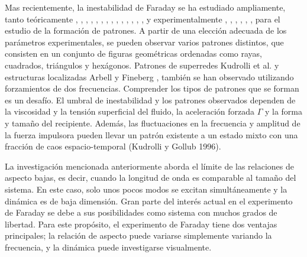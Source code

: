Mas recientemente, la inestabilidad de Faraday se ha estudiado ampliamente, tanto teóricamente \cite{Benjamin1954}, \cite{Miles1984}, \cite{Holmes1984}, \cite{Meron1986}, \cite{Gu1987}, \cite{Armbruster1989} \cite{Feng1989} \cite{Umeki1989} \cite{Miles1990}, \cite{Miles1993}, \cite{Bechhoefer1996}, \cite{Muller1997}, \cite{Muller1998a}, \cite{Mancebo2002}, \cite{Huepe2006}, \cite{Perinet2010}, \cite{Perinet2012}, y experimentalmente \cite{Douady1990}, \cite{Edwards1994}, \cite{Bechhoefer1995}, \cite{Kityk2002}, \cite{Westra2003}, \cite{Residori2007}, \cite{NguyemThuLam2011} para el estudio de la formación de patrones. A partir de una elección adecuada de los parámetros experimentales, se pueden observar varios patrones distintos, que consisten en un conjunto de figuras geométricas ordenadas como rayas, cuadrados, triángulos y hexágonos. Patrones de superredes Kudrolli et al. \cite{Kudrolli1998} y estructuras localizadas Arbell y Fineberg \cite{Arbell2000}, \cite{Arbell2002} también se han observado utilizando forzamientos de dos frecuencias. Comprender los tipos de patrones que se forman es un desafío. El umbral de inestabilidad y los patrones observados dependen de la viscosidad y la tensión superficial del fluido, la aceleración forzada $\Gamma$ y la forma y tamaño del recipiente. Además, las fluctuaciones en la frecuencia y amplitud de la fuerza impulsora pueden llevar un patrón existente a un estado mixto con una fracción de caos espacio-temporal (Kudrolli y Gollub 1996).


La investigación mencionada anteriormente aborda el límite de las relaciones de aspecto bajas, es decir, cuando la longitud de onda es comparable al tamaño del sistema. En este caso, solo unos pocos modos se excitan simultáneamente y la dinámica es de baja dimensión. Gran parte del interés actual en el experimento de Faraday se debe a sus posibilidades como sistema con muchos grados de libertad. Para este propósito, el experimento de Faraday tiene dos ventajas principales; la relación de aspecto puede variarse simplemente variando la frecuencia, y la dinámica puede investigarse visualmente.

